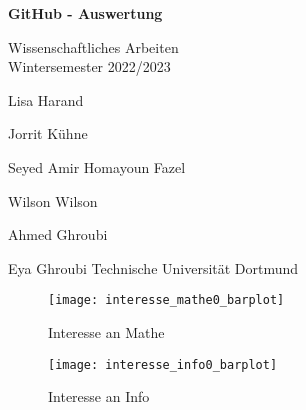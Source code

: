 \documentclass[paper=a4,                 %
               fontsize=12pt,            %
               parskip=half,             %
               ngerman,                 %
               ]{scrartcl}
\begin{document}
\begin{titlepage}
    \begin{center}
        \vspace*{3cm}
            
        \Huge
        \textbf{GitHub - Auswertung}
            
        \vspace{0.5cm}
        \LARGE
        Wissenschaftliches Arbeiten\\ 
        \Large
        Wintersemester 2022/2023
        \vspace{2cm}      
           
        Lisa Harand 
        
		Jorrit Kühne
		
		Seyed Amir Homayoun Fazel 
		
		Wilson Wilson
		
		Ahmed Ghroubi 
		
		Eya Ghroubi 
        \vfill    
        \vspace{0.8cm} 
        \Large
        Technische Universität Dortmund\\
            
    \end{center}
\end{titlepage}

\begin{figure}[h]
\begin{center}
      \texttt{[image: interesse\_mathe0\_barplot]}
      \caption{Interesse an Mathe}
	\texttt{[image: interesse\_info0\_barplot]}
	\caption{Interesse an Info}
\end{center}
\end{figure}
\end{document}
